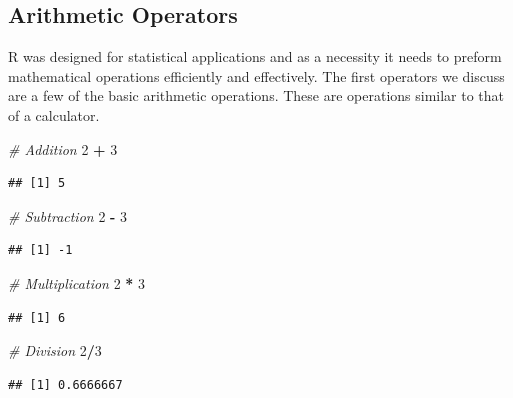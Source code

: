 \documentclass[
]{book}
\newenvironment{Shaded}{\begin{snugshade}}{\end{snugshade}}
\newcommand{\CommentTok}[1]{\textcolor[rgb]{0.56,0.35,0.01}{\textit{#1}}}
\newcommand{\DecValTok}[1]{\textcolor[rgb]{0.00,0.00,0.81}{#1}}
\newcommand{\OperatorTok}[1]{\textcolor[rgb]{0.81,0.36,0.00}{\textbf{#1}}}
\newcommand{\StringTok}[1]{\textcolor[rgb]{0.31,0.60,0.02}{#1}}
\begin{document}
\hypertarget{arithmetic-operators}{%
\subsection*{Arithmetic Operators}\label{arithmetic-operators}}

R was designed for statistical applications and as a necessity it needs to preform mathematical operations efficiently and effectively. The first operators we discuss are a few of the basic arithmetic operations. These are operations similar to that of a calculator.

\begin{Shaded}
\begin{Highlighting}[]
\CommentTok{# Addition}
\DecValTok{2} \OperatorTok{+}\StringTok{ }\DecValTok{3}
\end{Highlighting}
\end{Shaded}

\begin{verbatim}
## [1] 5
\end{verbatim}

\begin{Shaded}
\begin{Highlighting}[]
\CommentTok{# Subtraction}
\DecValTok{2} \OperatorTok{-}\StringTok{ }\DecValTok{3}
\end{Highlighting}
\end{Shaded}

\begin{verbatim}
## [1] -1
\end{verbatim}

\begin{Shaded}
\begin{Highlighting}[]
\CommentTok{# Multiplication}
\DecValTok{2} \OperatorTok{*}\StringTok{ }\DecValTok{3}
\end{Highlighting}
\end{Shaded}

\begin{verbatim}
## [1] 6
\end{verbatim}

\begin{Shaded}
\begin{Highlighting}[]
\CommentTok{# Division}
\DecValTok{2}\OperatorTok{/}\DecValTok{3}
\end{Highlighting}
\end{Shaded}

\begin{verbatim}
## [1] 0.6666667
\end{verbatim}
\end{document}
